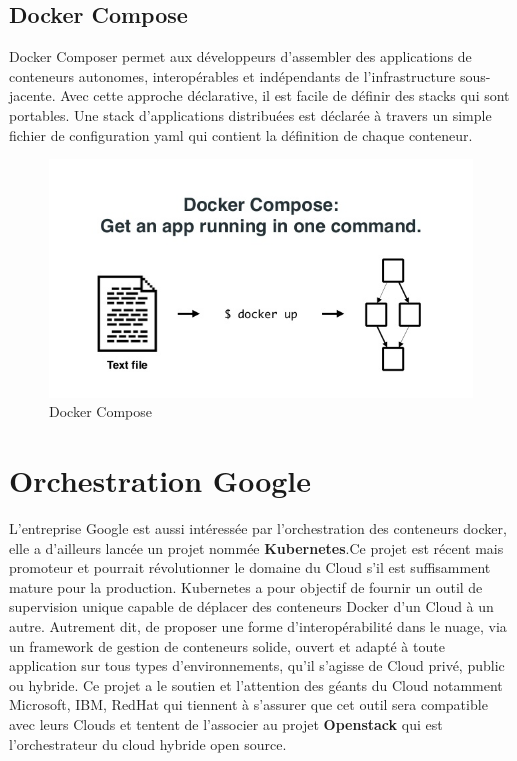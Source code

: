 \begin{onehalfspace}
\subsection*{Docker Compose}
  Docker Composer permet aux développeurs d'assembler des applications de conteneurs autonomes, interopérables et indépendants de l'infrastructure sous-jacente. Avec cette approche déclarative, il est facile de définir des stacks qui sont portables. Une stack d'applications distribuées est déclarée à travers un simple fichier de configuration \acrshort{yaml} qui contient la définition de chaque conteneur.
\begin{figure}[H]
\centering
\includegraphics [scale=0.5]{chapitre3/assets/dockercompose.jpg}
\caption{Docker Compose}
\end{figure}
\section{Orchestration Google}


L'entreprise Google est aussi intéressée par l'orchestration des conteneurs docker, elle a d'ailleurs lancée un projet nommée \textbf{Kubernetes}.Ce projet est récent mais promoteur et pourrait révolutionner le domaine du Cloud s'il est suffisamment mature pour la production. Kubernetes a pour objectif de fournir un outil de supervision unique capable de déplacer des conteneurs Docker d'un Cloud à un autre. Autrement dit, de proposer une forme d’interopérabilité dans le nuage, via un framework de gestion de conteneurs solide, ouvert et adapté à toute application sur tous types d’environnements, qu’il s’agisse de Cloud privé, public ou hybride. Ce projet a le soutien et l'attention des géants du Cloud notamment Microsoft, IBM, RedHat qui tiennent à s'assurer que cet outil sera compatible avec leurs Clouds et tentent de l'associer au projet \textbf{Openstack} qui est l'orchestrateur du cloud hybride open source.

\end{onehalfspace}
